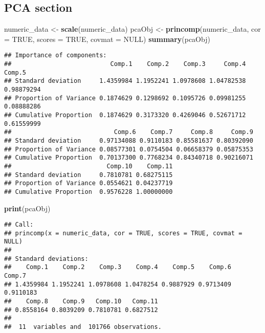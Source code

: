 \documentclass[]{article}
\newenvironment{Shaded}{\begin{snugshade}}{\end{snugshade}}
\newcommand{\KeywordTok}[1]{\textcolor[rgb]{0.13,0.29,0.53}{\textbf{#1}}}
\newcommand{\DataTypeTok}[1]{\textcolor[rgb]{0.13,0.29,0.53}{#1}}
\newcommand{\StringTok}[1]{\textcolor[rgb]{0.31,0.60,0.02}{#1}}
\newcommand{\OtherTok}[1]{\textcolor[rgb]{0.56,0.35,0.01}{#1}}
\newcommand{\NormalTok}[1]{#1}
\begin{document}
\subsection{PCA section}\label{pca-section}

\begin{Shaded}
\begin{Highlighting}[]
\NormalTok{numeric_data <-}\StringTok{ }\KeywordTok{scale}\NormalTok{(numeric_data)}
\NormalTok{pcaObj <-}\StringTok{ }\KeywordTok{princomp}\NormalTok{(numeric_data, }\DataTypeTok{cor =} \OtherTok{TRUE}\NormalTok{, }\DataTypeTok{scores =} \OtherTok{TRUE}\NormalTok{, }\DataTypeTok{covmat =} \OtherTok{NULL}\NormalTok{)}
\KeywordTok{summary}\NormalTok{(pcaObj)}
\end{Highlighting}
\end{Shaded}

\begin{verbatim}
## Importance of components:
##                           Comp.1    Comp.2    Comp.3     Comp.4     Comp.5
## Standard deviation     1.4359984 1.1952241 1.0978608 1.04782538 0.98879294
## Proportion of Variance 0.1874629 0.1298692 0.1095726 0.09981255 0.08888286
## Cumulative Proportion  0.1874629 0.3173320 0.4269046 0.52671712 0.61559999
##                            Comp.6    Comp.7     Comp.8     Comp.9
## Standard deviation     0.97134088 0.9110183 0.85581637 0.80392090
## Proportion of Variance 0.08577301 0.0754504 0.06658379 0.05875353
## Cumulative Proportion  0.70137300 0.7768234 0.84340718 0.90216071
##                          Comp.10    Comp.11
## Standard deviation     0.7810781 0.68275115
## Proportion of Variance 0.0554621 0.04237719
## Cumulative Proportion  0.9576228 1.00000000
\end{verbatim}

\begin{Shaded}
\begin{Highlighting}[]
\KeywordTok{print}\NormalTok{(pcaObj)}
\end{Highlighting}
\end{Shaded}

\begin{verbatim}
## Call:
## princomp(x = numeric_data, cor = TRUE, scores = TRUE, covmat = NULL)
## 
## Standard deviations:
##    Comp.1    Comp.2    Comp.3    Comp.4    Comp.5    Comp.6    Comp.7 
## 1.4359984 1.1952241 1.0978608 1.0478254 0.9887929 0.9713409 0.9110183 
##    Comp.8    Comp.9   Comp.10   Comp.11 
## 0.8558164 0.8039209 0.7810781 0.6827512 
## 
##  11  variables and  101766 observations.
\end{verbatim}
\end{document}
